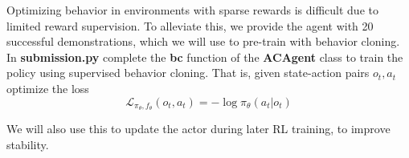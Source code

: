 \item {} 

Optimizing behavior in environments with sparse rewards is difficult due to limited reward supervision. To alleviate this, we provide the agent with 20 successful demonstrations, which we will use to pre-train with behavior cloning. In \textbf{submission.py} complete the \textbf{bc} function of the \textbf{ACAgent} class to train the policy using supervised behavior cloning. That is, given state-action pairs $o_t, a_t$ optimize the loss $$\mathcal{L}_{\pi_{\theta}, f_{\theta}}(o_t, a_t) = -\log \pi_{\theta}(a_t|o_t)$$

We will also use this to update the actor during later RL training, to improve stability.
